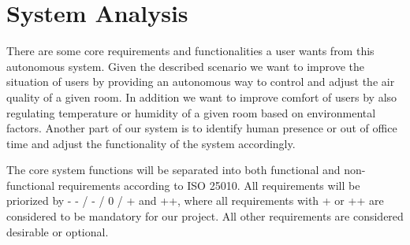 \documentclass[runningheads]{llncs}
\begin{document}
%
%
%


    \section{System Analysis}
    There are some core requirements and functionalities a user wants from this autonomous system.
    Given the described scenario we want to improve the situation of users by providing an autonomous way to control and adjust the air quality of a given room.
    In addition we want to improve comfort of users by also regulating temperature or humidity of a given room based on environmental factors.
    Another part of our system is to identify human presence or out of office time and adjust the functionality of the system accordingly.

    The core system functions will be separated into both functional and non-functional requirements according to ISO 25010.
    All requirements will be priorized by - - / - / 0 / + and ++, where all requirements with + or ++ are considered to be mandatory for our project.
    All other requirements are considered desirable or optional.
\end{document}

